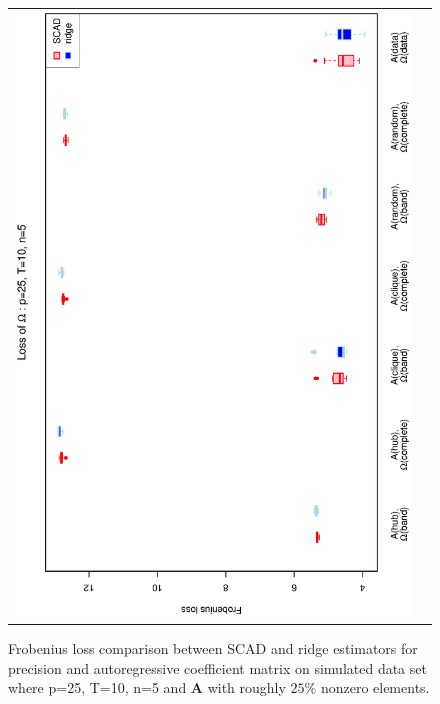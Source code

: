 \begin{figure}[h!]
\begin{tabular}{cc}
\includegraphics[scale=0.45,angle=270]{LossOmega25T10N5_25.eps}
\end{tabular}
\caption{Frobenius loss comparison between SCAD and ridge estimators for precision and autoregressive coefficient matrix on simulated data set where p=25, T=10, n=5  and $\mathbf{A}$ with roughly $25\%$ nonzero elements.}
\label{figSM:Loss25T10N5_25}
\end{figure}


